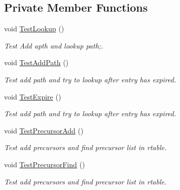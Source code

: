 \subsection*{Private Member Functions}
\begin{DoxyCompactItemize}
\item 
void \hyperlink{classHwmpRtableTest_a448f1f9bce7965fe1ae4d541f4fe8f18}{Test\+Lookup} ()
\begin{DoxyCompactList}\small\item\em Test Add apth and lookup path;. \end{DoxyCompactList}\item 
void \hyperlink{classHwmpRtableTest_a86b7d54fd30d26a0001c5ba1d17ad3fb}{Test\+Add\+Path} ()
\begin{DoxyCompactList}\small\item\em Test add path and try to lookup after entry has expired. \end{DoxyCompactList}\item 
void \hyperlink{classHwmpRtableTest_af873b495a35015eeb489b1ddd56cadfc}{Test\+Expire} ()
\begin{DoxyCompactList}\small\item\em Test add path and try to lookup after entry has expired. \end{DoxyCompactList}\item 
void \hyperlink{classHwmpRtableTest_ac5ef1a0da47e62575e523ade410c465f}{Test\+Precursor\+Add} ()
\begin{DoxyCompactList}\small\item\em Test add precursors and find precursor list in rtable. \end{DoxyCompactList}\item 
void \hyperlink{classHwmpRtableTest_abf80a06eae493dd54a0e8ed62f25d82e}{Test\+Precursor\+Find} ()
\begin{DoxyCompactList}\small\item\em Test add precursors and find precursor list in rtable. \end{DoxyCompactList}\end{DoxyCompactItemize}
